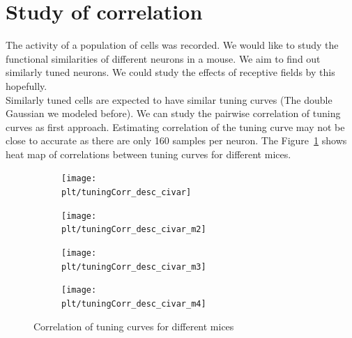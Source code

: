 \documentclass[11pt]{article}
\newcommand{\plt}{../../plots}
\begin{document}
\section{Study of correlation} %
\label{sub:study_of_correlation}
The activity of a population of cells was recorded. We would like to study the functional similarities of different neurons in a mouse. We aim to find out similarly tuned neurons. We could study the effects of receptive fields by this hopefully.\\
Similarly tuned cells are expected to have similar tuning curves (The double Gaussian we modeled before). We can study the pairwise correlation of tuning curves as first approach. Estimating correlation of the tuning curve may not be close to accurate as there are only 160 samples per neuron. The Figure~\ref{tuningCorr} shows heat map of correlations between tuning curves for different mices.
\begin{figure}
    \centering
    \begin{subfigure}{.48\textwidth}
        \centering
        \texttt{[image: \\plt/tuningCorr\_desc\_civar]}
    \end{subfigure}
    \begin{subfigure}{.48\textwidth}
        \centering
        \texttt{[image: \\plt/tuningCorr\_desc\_civar\_m2]}
    \end{subfigure}
    \newline
    \begin{subfigure}{.48\textwidth}
        \centering
        \texttt{[image: \\plt/tuningCorr\_desc\_civar\_m3]}
    \end{subfigure}
    \begin{subfigure}{.48\textwidth}
        \centering
        \texttt{[image: \\plt/tuningCorr\_desc\_civar\_m4]}
    \end{subfigure}
    \caption{Correlation of tuning curves for different mices}
    \label{tuningCorr}
\end{figure}
\end{document}
